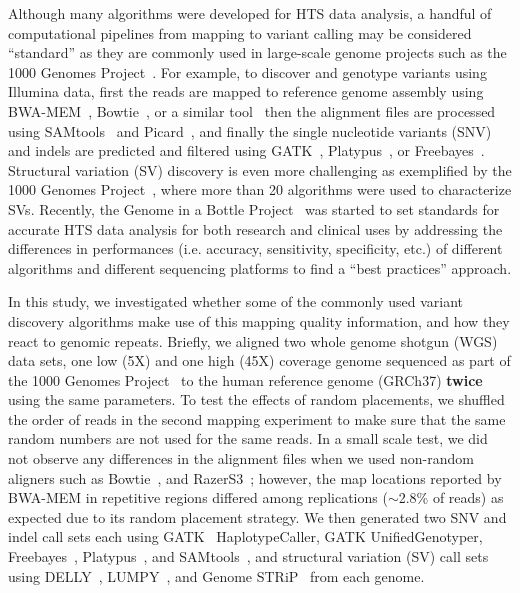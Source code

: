 \documentclass[10pt,a4paper]{article}
\begin{document}
Although many algorithms were developed for HTS data analysis, a handful of computational pipelines from mapping to variant calling may be considered ``standard'' as they are commonly used in large-scale genome projects such as the 1000 Genomes Project~\cite{1000GP,1000GP2012,1000GP2015}. For example, to discover and genotype variants using Illumina data, first the reads are mapped to reference genome assembly using BWA-MEM~\cite{Li2009a,Li2013}, Bowtie~\cite{Langmead2009}, or a similar tool~\cite{Alkan2009,Weese2012} then the alignment files are processed using SAMtools~\cite{Li2009b} and Picard~\cite{picard}, and finally the single nucleotide variants (SNV) and indels are predicted and filtered using GATK~\cite{DePristo2011}, Platypus~\cite{Rimmer2014}, or Freebayes~\cite{Garrison2012}. 
Structural variation (SV) discovery is even more challenging as exemplified by the 1000 Genomes Project~\cite{1000GP,1000GP2012,Mills2011}, where more than 20 algorithms were used to characterize SVs.
Recently, the Genome in a Bottle Project~\cite{Zook2014} was started to set standards for accurate HTS data analysis for both research and clinical uses by addressing the differences in performances (i.e. accuracy, sensitivity, specificity, etc.) of different algorithms and different sequencing platforms
 to find a ``best practices'' approach.

In this study, we investigated whether some of the commonly used variant discovery algorithms
make use of this mapping quality information, and how they react to genomic repeats.
Briefly, 
we aligned two whole genome shotgun (WGS) data sets, one low (5X) and one high (45X) coverage genome
sequenced as part of the 1000 Genomes Project~\cite{1000GP2012} to the human reference genome (GRCh37) {\bf twice} using the same parameters. 
To test the effects of random placements,
we shuffled the order of reads in the second mapping experiment to make sure that the same random numbers are not used for the same reads. 
In a small scale test, we did not observe any differences
in the alignment files when we used non-random aligners such as Bowtie~\cite{Langmead2009}, and RazerS3~\cite{Weese2012}; %
however, 
the map locations reported by BWA-MEM in repetitive regions differed among replications ($\sim$2.8\% of reads) as expected due to its random placement strategy.
We then generated two SNV and indel call sets each using GATK~\cite{DePristo2011} HaplotypeCaller, GATK UnifiedGenotyper, Freebayes~\cite{Garrison2012}, Platypus~\cite{Rimmer2014}, and SAMtools~\cite{Li2009b}, and structural variation (SV) call sets using DELLY~\cite{Rausch2012}, LUMPY~\cite{Layer2014}, and Genome STRiP~\cite{Handsaker2011,Handsaker2015} from each genome.
\end{document}
